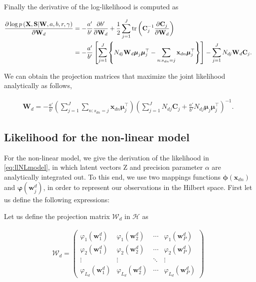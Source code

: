 \documentclass[]{article}
\newcommand{\Z}{\boldsymbol{\mathrm{Z}}}
\newcommand{\Cin}{\mathbf{C}_j}
\newcommand{\muJ}{\boldsymbol{\mu}_j}
\newcommand{\WIn}{\mathbf{W}}
\newcommand{\indobj}{\mathbf{x}_{dn}}
\newcommand{\projMat}{\boldsymbol{\mathcal{W}}_d}
\newcommand{\projMatI}{\mathbf{W}_d}
\newcommand{\dWjIn}{\partial\projMatI}
\newcommand{\phixnd}{\boldsymbol{\phi}\left(\indobj\right)}
\newcommand{\phiwld}[1]{\boldsymbol{\varphi}\left(\mathbf{w}_{#1}^d\right)}
\newcommand{\phiwldI}[2]{\varphi_{#2}\left(\mathbf{w}_{#1}^d\right)}
\begin{document}
Finally the derivative of the log-likelihood is computed as

\begin{align}
\frac{\partial \log p\left(\mathbf{X},\mathbf{S}|\WIn,a,b,r,\gamma\right)}{\partial\projMatI}  &=  -\frac{a'}{b'}\frac{\partial b'}{\dWjIn}+\frac{1}{2}\sum_{j=1}^{J} \operatorname{tr}\left(\Cin^{-1}\frac{\partial \Cin}{\dWjIn}\right) \notag \\
&=  -\frac{a'}{b'}\left[\sum_{j=1}^{J}\left\{N_{dj}\projMatI\muJ\muJ^\top - \sum_{n:s_{dn}=j}\indobj \muJ^\top\right\}\right] -\sum_{j=1}^{J}N_{dj}\projMatI\Cin.
\end{align}

We can obtain the projection matrices that maximize the joint likelihood analytically as follows,

\begin{align}
\projMatI =  -\frac{a'}{b'}\left(\sum_{j=1}^{J}{\sum_{n:s_{dn}=j}\indobj \muJ^\top}\right)\left(\sum_{j=1}^{J}{N_{dj}\Cin+\frac{a'}{b'}N_{dj}\muJ\muJ^\top} \right)^{-1}.
\end{align}

\subsection{Likelihood for the non-linear model}

For the non-linear model, we give the derivation of the likelihood in \eqref{eq:llNLmodel}, in which latent vectors $\Z$ and precision parameter $\alpha$ are analytically integrated out. To this end, we use two mappings functions $\phixnd$ and $\phiwld{j}$, in order to represent our observations in the Hilbert space. First let us define the following expressions:

Let us define the projection matrix $\projMat$ in $\mathcal{H}$ as

\begin{align}
\projMat =
\left(\begin{matrix}
   \phiwldI{1}{1} & \phiwldI{2}{1} & \cdots& \phiwldI{P}{1}  \\
   \phiwldI{1}{2} & \phiwldI{2}{2} &\cdots& \phiwldI{P}{2}  \\
   \vdots  & \vdots  & \ddots & \vdots  \\
   \phiwldI{1}{L_d} & \phiwldI{2}{L_d} &\cdots& \phiwldI{P}{L_d}
   \end{matrix} \right)
\end{align}
\end{document}
